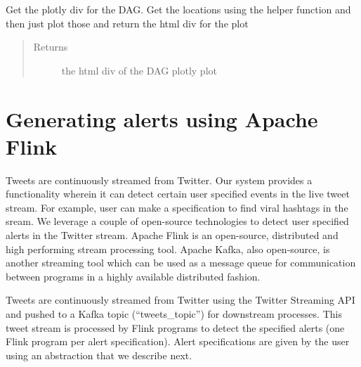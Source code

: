 \documentclass[letterpaper,10pt,english]{sphinxmanual}
\begin{document}
\begin{fulllineitems}
\begin{fulllineitems}
\label{\detokenize{dag:create_dag.DAG.plot_dag}}
Get the plotly div for the DAG. Get the locations using the helper function and then just plot those and return the html div for the plot
\begin{quote}\begin{description}
\item[{Returns}] \leavevmode
the html div of the DAG plotly plot

\end{description}\end{quote}

\end{fulllineitems}


\end{fulllineitems}



\chapter{Generating alerts using Apache Flink}
\label{\detokenize{flink:generating-alerts-using-apache-flink}}\label{\detokenize{flink::doc}}
Tweets are continuously streamed from Twitter. Our system provides a functionality wherein it can detect certain user specified events in the live tweet stream. For example, user can make a specification to find viral hashtags in the sream. We leverage a couple of open-source technologies to detect user specified alerts in the Twitter stream. Apache Flink is an open-source, distributed and high performing stream processing tool. Apache Kafka, also open-source, is another streaming tool which can be used as a message queue for communication between programs in a highly available distributed fashion.

Tweets are continuously streamed from Twitter using the Twitter Streaming API and pushed to a Kafka topic (“tweets\_topic”) for downstream processes. This tweet stream is processed by Flink programs to detect the specified alerts (one Flink program per alert specification). Alert specifications are given by the user using an abstraction that we describe next.
\end{document}
